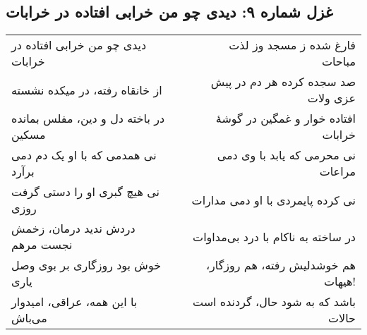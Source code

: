 \begin{center}
\section*{غزل شماره ۹: دیدی چو من خرابی افتاده در خرابات}
\label{sec:009}
\begin{longtable}{l p{0.5cm} r}
دیدی چو من خرابی افتاده در خرابات
&&
فارغ شده ز مسجد وز لذت مباحات
\\
از خانقاه رفته، در میکده نشسته
&&
صد سجده کرده هر دم در پیش عزی ولات
\\
در باخته دل و دین، مفلس بمانده مسکین
&&
افتاده خوار و غمگین در گوشهٔ خرابات
\\
نی همدمی که با او یک دم دمی برآرد
&&
نی محرمی که یابد با وی دمی مراعات
\\
نی هیچ گبری او را دستی گرفت روزی
&&
نی کرده پایمردی با او دمی مدارات
\\
دردش ندید درمان، زخمش نجست مرهم
&&
در ساخته به ناکام با درد بی‌مداوات
\\
خوش بود روزگاری بر بوی وصل یاری
&&
هم خوشدلیش رفته، هم روزگار، هیهات!
\\
با این همه، عراقی، امیدوار می‌باش
&&
باشد که به شود حال، گردنده است حالات
\\
\end{longtable}
\end{center}
